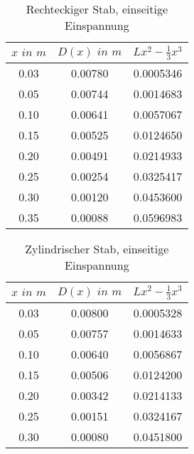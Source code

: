 \documentclass[
  bibliography=totoc,     %
  captions=tableheading,  %
  titlepage=firstiscover, %
]{scrartcl}
\author{%
  AUTOR A\\%
  \href{mailto:authorA@udo.edu}{authorA@udo.edu}%
  \texorpdfstring{\and}{,}%
  AUTOR B\\%
  \href{mailto:authorB@udo.edu}{authorB@udo.edu}%
}
\begin{document}
\begin{table}
  \centering
  \caption{Rechteckiger Stab, einseitige Einspannung}
  \label{tab:data2}
  \begin{tabular}{c c c  }
    \toprule $x \, \,  in \,\, m$ & $D(x) \,\, in \,\,  m$ & $Lx^2-\frac{1}{3}x^3$\\
    \midrule
    0.03 & 0.00780 & 0.0005346\\
    0.05 & 0.00744 & 0.0014683\\
    0.10 & 0.00641 & 0.0057067\\
    0.15 & 0.00525 & 0.0124650\\
    0.20 & 0.00491 & 0.0214933\\
    0.25 & 0.00254 & 0.0325417\\
    0.30 & 0.00120 & 0.0453600\\
    0.35 & 0.00088 & 0.0596983\\
    \bottomrule
  \end{tabular}
\end{table}

\begin{table}
  \centering
  \caption{Zylindrischer Stab, einseitige Einspannung}
  \label{tab:data2}
  \begin{tabular}{c c c  }
    \toprule $x \, \,  in \,\, m$ & $D(x) \,\, in \,\,  m$ & $Lx^2-\frac{1}{3}x^3$ \\
    \midrule
    0.03 & 0.00800 & 0.0005328\\
    0.05 & 0.00757 & 0.0014633\\
    0.10 & 0.00640 & 0.0056867\\
    0.15 & 0.00506 & 0.0124200\\
    0.20 & 0.00342 & 0.0214133\\
    0.25 & 0.00151 & 0.0324167\\
    0.30 & 0.00080 & 0.0451800\\
    \bottomrule
  \end{tabular}
\end{table}
\end{document}
